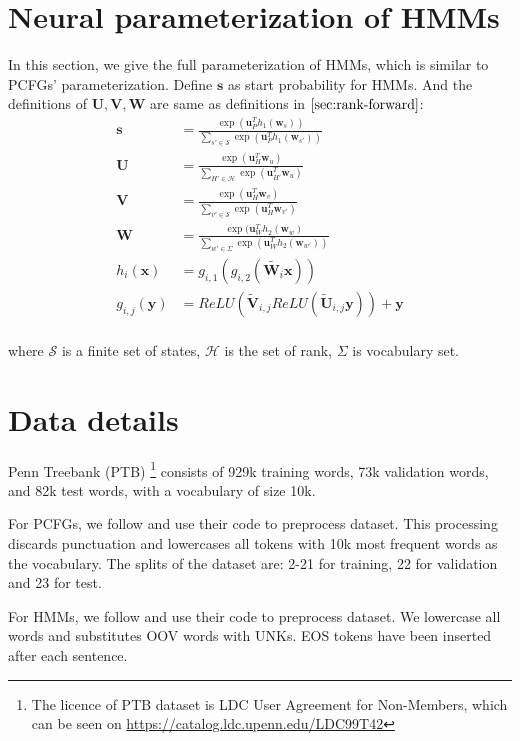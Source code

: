 \documentclass[11pt]{article}
\begin{document}
\section{Neural parameterization of HMMs}
\label{appd:hmm}
In this section, we give the full parameterization of HMMs, which is similar to PCFGs' parameterization. Define $\mathbf{s}$ as start probability for HMMs. And the definitions of $\mathbf{U}, \mathbf{V}, \mathbf{W}$ are same as definitions in $\ref{sec:rank-forward}$:
\begin{align*}
    \mathbf{s} &= \frac{\exp(\mathbf{u}_P^Th_1(\mathbf{w}_s))}{\sum_{s' \in \mathcal{S}}\exp(\mathbf{u}_P^Th_1(\mathbf{w}_{s'}))}\\
    \mathbf{U} &= \frac{\exp(\mathbf{u}_H^T\mathbf{w}_u)}{\sum_{H' \in \mathcal{H}}\exp(\mathbf{u}_{H'}^T\mathbf{w}_u)}\\
    \mathbf{V} &= \frac{\exp(\mathbf{u}_H^T\mathbf{w}_v)}{\sum_{v' \in \mathcal{S}}\exp(\mathbf{u}_{H}^T\mathbf{w}_{v'})}\\
    \mathbf{W} &= \frac{\exp(\mathbf{u}_W^Th_2(\mathbf{w}_w)}{\sum_{w' \in \Sigma}\exp(\mathbf{u}_W^Th_2(\mathbf{w}_{w'}))}\\
    h_i(\mathbf{x}) &= g_{i,1}(g_{i,2}(\tilde{\mathbf{W}_i}\mathbf{x}))\\
    g_{i,j}(\mathbf{y}) &= ReLU(\tilde{\mathbf{V}}_{i,j}ReLU(\tilde{\mathbf{U}}_{i,j}\mathbf{y})) + \mathbf{y}\\
\end{align*}

where $\mathcal{S}$ is a finite set of states, $\mathcal{H}$ is the set of rank, $\Sigma$ is vocabulary set.

\section{Data details}
\label{appd:data}
Penn Treebank (PTB) \citep{marcus-etal-1994-penn}\footnote{The licence of PTB dataset is LDC User Agreement for Non-Members, which can be seen on \url{https://catalog.ldc.upenn.edu/LDC99T42}} consists of 929k training words, 73k validation words, and 82k test words, with a vocabulary of size 10k. 

For PCFGs, we follow \citet{yang-etal-2021-pcfgs} and use their code to preprocess dataset. This processing discards punctuation and lowercases all tokens with 10k most frequent words as the vocabulary. The splits of the dataset are: 2-21 for training, 22 for validation and 23 for test.

For HMMs, we follow \citet{chiu2021low} and use their code to preprocess dataset. We lowercase all words and substitutes OOV words with UNKs. EOS tokens have been inserted after each sentence.
\end{document}
